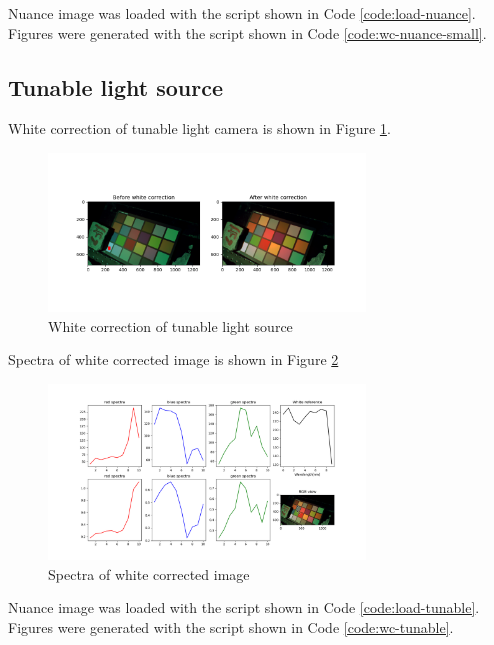 Nuance image was loaded with the script shown in Code \ref{code:load-nuance}.
Figures were generated with the script shown in Code \ref{code:wc-nuance-small}.

\subsection{Tunable light source}
White correction of tunable light camera is shown in Figure
\ref{fig:wc-tunable}.

\begin{figure}[H]
  \centering
  \caption{White correction of tunable light source}
  \label{fig:wc-tunable}
  \includegraphics[width=0.75\textwidth]{
    ./fig-task1/wc-tunable.png
  }
\end{figure}

Spectra of white corrected image is shown in Figure \ref{fig:wc-tunable-spectra}

\begin{figure}[H]
  \centering
  \caption{Spectra of white corrected image}
  \label{fig:wc-tunable-spectra}
  \includegraphics[width=0.75\textwidth]{
    ./fig-task1/wc-tunable-spectra.png
  }
\end{figure}

Nuance image was loaded with the script shown in Code \ref{code:load-tunable}.
Figures were generated with the script shown in Code \ref{code:wc-tunable}.
